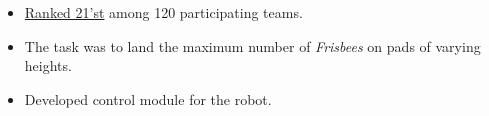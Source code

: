 \documentclass[10pt,a4paper,ragged2e]{altacv}
\begin{document}
\begin{itemize}
    \item \underline{Ranked 21'st} among 120 participating teams.
    \item The task was to land the maximum number of \textit{Frisbees} on pads of varying heights.
    \item Developed control module for the robot.
\end{itemize}












\end{document}
